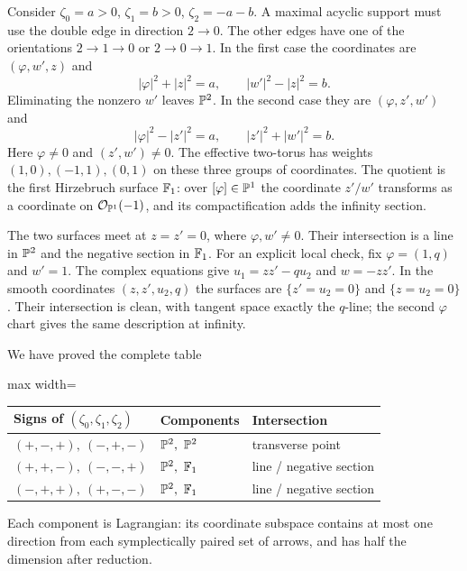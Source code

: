 Consider $\zeta_0=a>0$, $\zeta_1=b>0$,
$\zeta_2=-a-b$. A maximal acyclic support must use
the double edge in direction $2\to0$. The other
edges have one of the orientations $2\to1\to0$
or $2\to0\to1$. In the first case the coordinates
are $(\varphi,w',z)$ and
\[
 |\varphi|^2+|z|^2=a,\qquad |w'|^2-|z|^2=b.
\]
Eliminating the nonzero $w'$ leaves $\mathbb P^2$.
In the second case they are $(\varphi,z',w')$ and
\[
 |\varphi|^2-|z'|^2=a,\qquad |z'|^2+|w'|^2=b.
\]
Here $\varphi\ne0$ and $(z',w')\ne0$. The
effective two-torus has weights $(1,0),(-1,1),(0,1)$
on these three groups of coordinates. The quotient
is the first Hirzebruch surface $\mathbb F_1$: over
$[\varphi]\in\mathbb P^1$ the coordinate $z'/w'$
transforms as a coordinate on $\mathcal O_{\mathbb P^1}(-1)$,
and its compactification adds the infinity section.

The two surfaces meet at $z=z'=0$, where
$\varphi,w'\ne0$. Their intersection is a line
in $\mathbb P^2$ and the negative section in $\mathbb F_1$.
For an explicit local check, fix
$\varphi=(1,q)$ and $w'=1$. The complex equations
give $u_1=zz'-qu_2$ and $w=-zz'$. In the smooth
coordinates $(z,z',u_2,q)$ the surfaces are
$\{z'=u_2=0\}$ and $\{z=u_2=0\}$.
Their intersection is clean, with tangent space
exactly the $q$-line; the second $\varphi$ chart
gives the same description at infinity.

We have proved the complete table
\begin{center}
\begin{adjustbox}{max width=\textwidth}
\begin{tabular}{lll}
\toprule
Signs of $(\zeta_0,\zeta_1,\zeta_2)$ & Components & Intersection\\
\midrule
$(+,-,+),\ (-,+,-)$ & $\PP^2,\ \PP^2$ & transverse point\\
$(+,+,-),\ (-,-,+)$ & $\PP^2,\ \FF_1$ & line / negative section\\
$(-,+,+),\ (+,-,-)$ & $\PP^2,\ \FF_1$ & line / negative section\\
\bottomrule
\end{tabular}
\end{adjustbox}
\end{center}
Each component is Lagrangian: its coordinate
subspace contains at most one direction from each
symplectically paired set of arrows, and has half
the dimension after reduction.

